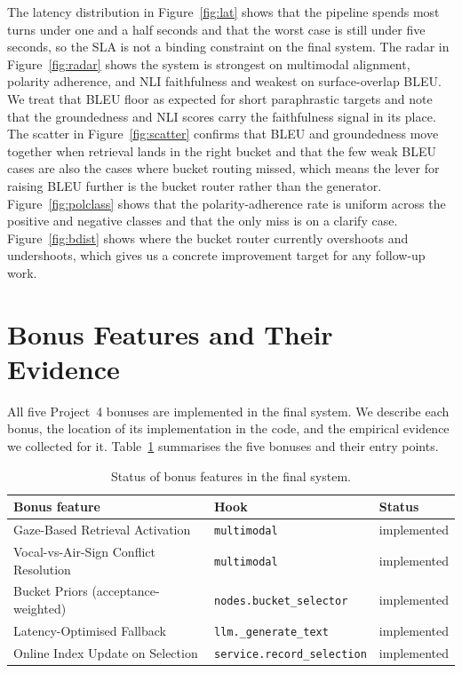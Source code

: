 \documentclass[10pt,letterpaper]{article}
\begin{document}
The latency distribution in Figure~\ref{fig:lat} shows that the
pipeline spends most turns under one and a half seconds and that the
worst case is still under five seconds, so the SLA is not a binding
constraint on the final system. The radar in Figure~\ref{fig:radar}
shows the system is strongest on multimodal alignment, polarity
adherence, and NLI faithfulness and weakest on surface-overlap
BLEU. We treat that BLEU floor as expected for short paraphrastic
targets and note that the groundedness and NLI scores carry the
faithfulness signal in its place. The scatter in
Figure~\ref{fig:scatter} confirms that BLEU and groundedness move
together when retrieval lands in the right bucket and that the few
weak BLEU cases are also the cases where bucket routing missed,
which means the lever for raising BLEU further is the bucket router
rather than the generator. Figure~\ref{fig:polclass} shows that the
polarity-adherence rate is uniform across the positive and negative
classes and that the only miss is on a clarify case. Figure~\ref{fig:bdist}
shows where the bucket router currently overshoots and undershoots,
which gives us a concrete improvement target for any follow-up work.

\section{Bonus Features and Their Evidence}
All five Project~4 bonuses are implemented in the final system. We
describe each bonus, the location of its implementation in the code,
and the empirical evidence we collected for it. Table~\ref{tab:bonus}
summarises the five bonuses and their entry points.

\begin{table}[t]
  \footnotesize
  \begin{tabularx}{\linewidth}{@{}Xll@{}}
    \toprule
    \rowcolor{tblHeadBonus}\textbf{Bonus feature} & \textbf{Hook}
                                                  & \textbf{Status}\\
    \midrule
    Gaze-Based Retrieval Activation
        & \texttt{multimodal}        & implemented\\
    Vocal-vs-Air-Sign Conflict Resolution
        & \texttt{multimodal}        & implemented\\
    Bucket Priors (acceptance-weighted)
        & \texttt{nodes.bucket\_selector} & implemented\\
    Latency-Optimised Fallback
        & \texttt{llm.\_generate\_text} & implemented\\
    Online Index Update on Selection
        & \texttt{service.record\_selection} & implemented\\
    \bottomrule
  \end{tabularx}
  \caption{Status of bonus features in the final system.}
  \label{tab:bonus}
\end{table}
\end{document}
